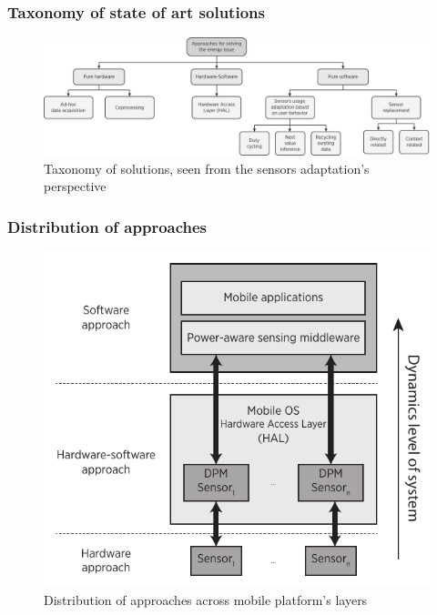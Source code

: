 \documentclass[compress,9pt,xcolor={dvipsnames,table}]{beamer}
\begin{document}
\begin{frame}\frametitle{Taxonomy of state of art solutions}
\begin{figure}[tb]
  \centering
  \includegraphics[width=\textwidth]{../../../resources/images/vectors/approaches-taxonomy}
  \caption{Taxonomy of solutions, seen from the sensors adaptation's perspective}
  \label{fig:taxonomy}
\end{figure}
\end{frame}

\begin{frame}\frametitle{Distribution of approaches}
\begin{figure}[tb]
  \centering
  \includegraphics[scale=0.72]{../../../resources/images/vectors/approaches-distribution}
  \caption{Distribution of approaches across mobile platform's layers}
  \label{fig:distribution}
\end{figure}
\end{frame}
\end{document}
